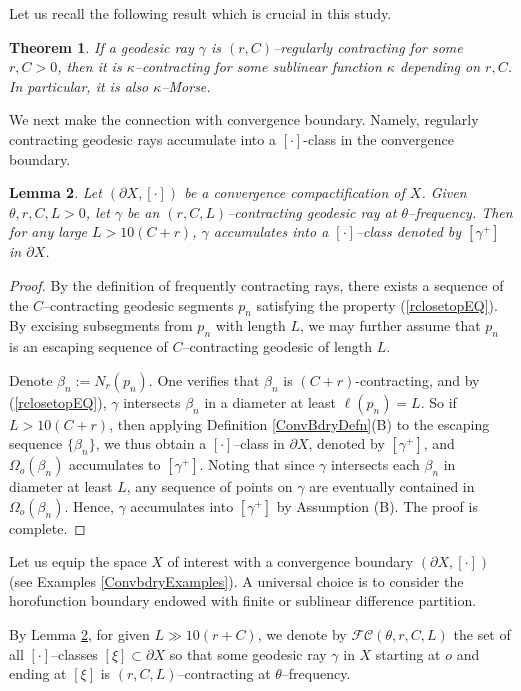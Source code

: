 \documentclass{amsart}
\newtheorem{thm}{Theorem}[section]
\newtheorem{lem}[thm]{Lemma}
\theoremstyle{definition}
\theoremstyle{remark}
\newcommand{\U}{ X}
\newcommand{\pU}{\partial{  X}}
\newcommand{\len }{\ell}
\begin{document}
Let us recall the following result which is crucial in this study.
\begin{thm} \cite{GQR22}\label{GQRtheorem}
If a geodesic ray $\gamma$ is $(r,C)$--regularly contracting for some $r,C>0$, then it is $\kappa$--contracting for some sublinear function
$\kappa$ depending on $r,C$. In particular, it is also $\kappa$--Morse. 
\end{thm} 

We next make the connection with convergence boundary. Namely, regularly contracting geodesic rays accumulate into a $[\cdot]$-class in the convergence boundary.
\begin{lem}\label{RegCConverge}
Let $(\pU, [\cdot])$ be a convergence compactification of $X$. Given $\theta, r, C, L>0$, let $\gamma$ be an $(r, C, L)$--contracting geodesic ray  at $\theta$--frequency. Then for any  large $L>10(C+r)$, $\gamma$  accumulates into a $[\cdot]$--class denoted by $[\gamma^+]$  in $\pU$.
\end{lem}
\begin{proof}
By the definition of frequently contracting rays, there exists  a sequence of the $C$--contracting geodesic segments $p_n$  satisfying the property (\ref{rclosetopEQ}). By excising subsegments  from $p_n$ with length $L$, we may further assume that $p_n$ is an escaping sequence of $C$--contracting geodesic of length $L$. 

Denote  $\beta_n:=N_r(p_n)$. One verifies that $\beta_n$ is $(C+r)$-contracting, and by  (\ref{rclosetopEQ}), $\gamma$ intersects $\beta_n$ in a diameter at least $\len(p_n)=L$. So if $L>10(C+r)$, then applying  Definition \ref{ConvBdryDefn}(B) to the escaping sequence $\{\beta_n\}$, we thus obtain a  $[\cdot]$--class  in  $\pU$,  denoted by $[\gamma^+]$, and $\Omega_o(\beta_n)$ accumulates to $[\gamma^+]$. Noting that since $\gamma$ intersects each $\beta_n$  in diameter at least  $L$,   any sequence of points on $\gamma$ are eventually contained in $\Omega_o(\beta_n)$. Hence, $\gamma$ accumulates into $[\gamma^+]$ by Assumption (B).  The proof is complete.    
\end{proof}
 


Let us equip the space $\U$ of interest with a convergence boundary $(\pU,[\cdot])$ (see Examples \ref{ConvbdryExamples}). A universal choice is to consider the horofunction boundary endowed with finite or sublinear difference partition.

By Lemma \ref{RegCConverge}, for given $L\gg 10(r+ C)$, we denote by $\mathcal{FC}(\theta,r, C,L)$  the set of  all $[\cdot]$--classes   $[\xi]\subset \pU$ so that some geodesic ray $\gamma$ in $\U$ starting at $o$ and ending at $[\xi]$  is $(r,C,L)$--contracting at $\theta$--frequency. 
\end{document}
